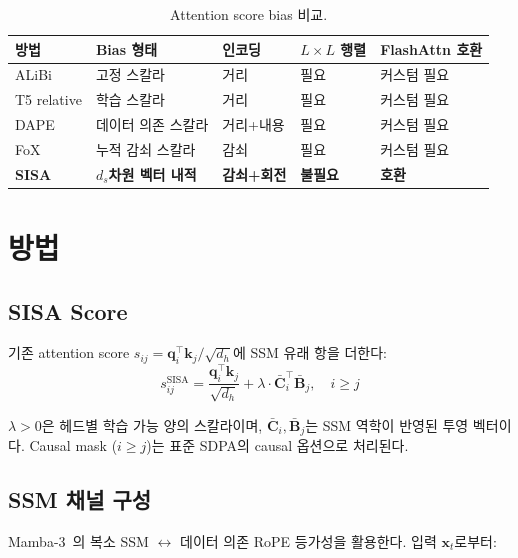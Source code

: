 \documentclass[11pt]{article}
\begin{document}
\begin{table}[h]
\centering\small
\caption{Attention score bias 비교.}
\begin{tabular}{lllll}
\toprule
\textbf{방법} & \textbf{Bias 형태} & \textbf{인코딩} & \textbf{$L{\times}L$ 행렬} & \textbf{FlashAttn 호환} \\
\midrule
ALiBi & 고정 스칼라 & 거리 & 필요 & 커스텀 필요 \\
T5 relative & 학습 스칼라 & 거리 & 필요 & 커스텀 필요 \\
DAPE & 데이터 의존 스칼라 & 거리+내용 & 필요 & 커스텀 필요 \\
FoX & 누적 감쇠 스칼라 & 감쇠 & 필요 & 커스텀 필요 \\
\midrule
\textbf{SISA} & \textbf{$d_s$차원 벡터 내적} & \textbf{감쇠+회전} & \textbf{불필요} & \textbf{호환} \\
\bottomrule
\end{tabular}
\end{table}

\section{방법}

\subsection{SISA Score}

기존 attention score $s_{ij} = \mathbf{q}_i^\top \mathbf{k}_j / \sqrt{d_h}$에 SSM 유래 항을 더한다:
\begin{equation}
s_{ij}^{\text{SISA}} = \frac{\mathbf{q}_i^\top \mathbf{k}_j}{\sqrt{d_h}} + \lambda \cdot \bar{\mathbf{C}}_i^\top \bar{\mathbf{B}}_j, \quad i \geq j
\label{eq:sisa_score}
\end{equation}

$\lambda > 0$은 헤드별 학습 가능 양의 스칼라이며, $\bar{\mathbf{C}}_i, \bar{\mathbf{B}}_j$는 SSM 역학이 반영된 투영 벡터이다. Causal mask ($i \geq j$)는 표준 SDPA의 causal 옵션으로 처리된다.

\subsection{SSM 채널 구성}

Mamba-3~\citep{mamba3}의 복소 SSM $\leftrightarrow$ 데이터 의존 RoPE 등가성을 활용한다. 입력 $\mathbf{x}_t$로부터:
\end{document}
